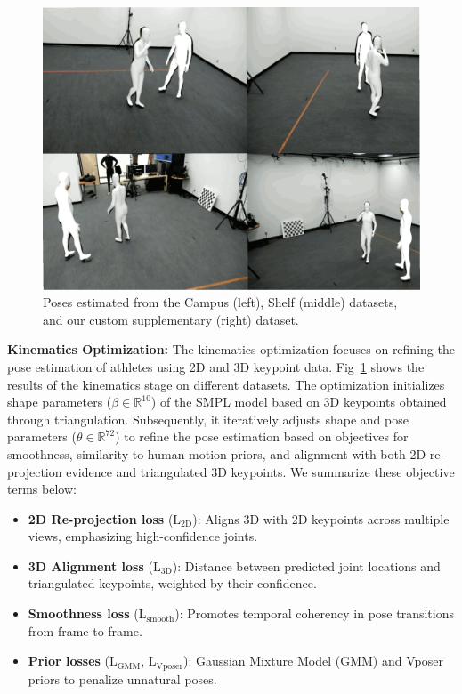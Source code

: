\documentclass{egpubl}
\begin{document}
\begin{figure}[htb]
\begin{minipage}[b]{0.32\textwidth}
        \includegraphics[width=\linewidth]{figures/supp.png}
    \end{minipage}%
    \caption{Poses estimated from the Campus (left), Shelf (middle) datasets, and our custom supplementary (right) dataset. }
    \label{fig:qualitative}
    \vspace{-16pt}
\end{figure}

\textbf{Kinematics Optimization:} The kinematics optimization focuses on refining the pose estimation of athletes using 2D and 3D keypoint data. Fig~\ref{fig:qualitative} shows the results of the kinematics stage on different datasets.
The optimization initializes shape parameters ($\beta \in \mathbb{R}^{10}$) of the SMPL model based on 3D keypoints obtained through triangulation. Subsequently, it iteratively adjusts shape and pose parameters ($\theta \in \mathbb{R}^{72}$) to refine the pose estimation based on objectives for smoothness, similarity to human motion priors, and alignment with both 2D re-projection evidence and triangulated 3D keypoints. We summarize these objective terms below: 
\begin{itemize}
    \item \textbf{2D Re-projection  loss} ($\mathrm{L}_\text{2D}$): Aligns 3D with 2D keypoints across multiple views, emphasizing high-confidence joints.
    \item \textbf{3D Alignment loss} ($\mathrm{L}_\text{3D}$): Distance between predicted joint locations and triangulated keypoints, weighted by their confidence.
    \item \textbf{Smoothness loss} ($\mathrm{L}_\text{smooth}$): Promotes temporal coherency in pose transitions from frame-to-frame.
    \item \textbf{Prior losses} ($\mathrm{L}_{\text{GMM}}$, $\mathrm{L}_{\text{Vposer}}$): Gaussian Mixture Model (GMM) and Vposer~\cite{Vposer} priors to penalize unnatural poses.
\end{itemize}
\end{document}
